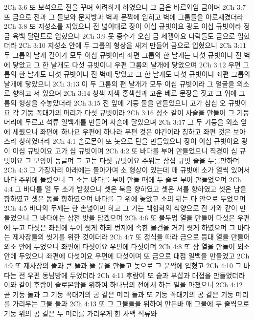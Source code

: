 2Ch 3:6  또 보석으로 전을 꾸며 화려하게 하였으니 그 금은 바르와임 금이며
2Ch 3:7  또 금으로 전과 그 들보와 문지방과 벽과 문짝에 입히고 벽에 그룹들을 아로새겼더라
2Ch 3:8  또 지성소를 지었으니 전 넓이대로 장이 이십 규빗이요 광도 이십 규빗이라 정금 육백 달란트로 입혔으니
2Ch 3:9  못 중수가 오십 금 세겔이요 다락들도 금으로 입혔더라
2Ch 3:10  지성소 안에 두 그룹의 형상을 새겨 만들어 금으로 입혔으니
2Ch 3:11  두 그룹의 날개 길이가 모두 이십 규빗이라 좌편 그룹의 한 날개는 다섯 규빗이니 전 벽에 닿았고 그 한 날개도 다섯 규빗이니 우편 그룹의 날개에 닿았으며
2Ch 3:12  우편 그룹의 한 날개도 다섯 규빗이니 전 벽에 닿았고 그 한 날개도 다섯 규빗이니 좌편 그룹의 날개에 닿았으니
2Ch 3:13  이 두 그룹의 편 날개가 모두 이십 규빗이라 그 얼굴을 외소로 향하고 서 있으며
2Ch 3:14  청색 자색 홍색실과 고운 베로 문장을 짓고 그 위에 그룹의 형상을 수놓았더라
2Ch 3:15  전 앞에 기둥 둘을 만들었으니 고가 삼십 오 규빗이요 각 기둥 꼭대기의 머리가 다섯 규빗이라
2Ch 3:16  성소 같이 사슬을 만들어 그 기둥 머리에 두르고 석류 일백개를 만들어 사슬에 달았으며
2Ch 3:17  그 두 기둥을 외소 앞에 세웠으니 좌편에 하나요 우편에 하나라 우편 것은 야긴이라 칭하고 좌편 것은 보아스라 칭하였더라
2Ch 4:1  솔로몬이 또 놋으로 단을 만들었으니 장이 이십 규빗이요 광이 이십 규빗이요 고가 십 규빗이며
2Ch 4:2  또 바다를 부어 만들었으니 직경이 십 규빗이요 그 모양이 둥글며 그 고는 다섯 규빗이요 주위는 삼십 규빗 줄을 두를만하며
2Ch 4:3  그 가장자리 아래에는 돌아가며 소 형상이 있는데 매 규빗에 소가 열씩 있어서 바다 주위에 둘렸으니 그 소는 바다를 부어 만들 때에 두 줄로 부어 만들었으며
2Ch 4:4  그 바다를 열 두 소가 받쳤으니 셋은 북을 향하였고 셋은 서를 향하였고 셋은 남을 향하였고 셋은 동을 향하였으며 바다를 그 위에 놓았고 소의 뒤는 다 안으로 두었으며
2Ch 4:5  바다의 두께는 한 손넓이만 하고 그 가는 백합화의 식양으로 잔 가와 같이 만들었으니 그 바다에는 삼천 밧을 담겠으며
2Ch 4:6  또 물두멍 열을 만들어 다섯은 우편에 두고 다섯은 좌편에 두어 씻게 하되 번제에 속한 물건을 거기 씻게 하였으며 그 바다는 제사장들의 씻기를 위한 것이더라
2Ch 4:7  또 정식을 따라 금으로 등대 열을 만들어 외소 안에 두었으니 좌편에 다섯이요 우편에 다섯이며
2Ch 4:8  또 상 열을 만들어 외소 안에 두었으니 좌편에 다섯이요 우편에 다섯이며 또 금으로 대접 일백을 만들었고
2Ch 4:9  또 제사장의 뜰과 큰 뜰과 뜰 문을 만들고 놋으로 그 문짝에 입혔고
2Ch 4:10  그 바다는 전 우편 동남방에 두었더라
2Ch 4:11  후람이 또 솥과 부삽과 대접을 만들었더라 이와 같이 후람이 솔로몬왕을 위하여 하나님의 전에서 하는 일을 마쳤으니
2Ch 4:12  곧 기둥 둘과 그 기둥 꼭대기의 공 같은 머리 둘과 또 기둥 꼭대기의 공 같은 기둥 머리를 가리우는 그물 둘과
2Ch 4:13  또 그 그물들을 위하여 만든바 매 그물에 두 줄씩으로 기둥 위의 공 같은 두 머리를 가리우게 한 사백 석류와
